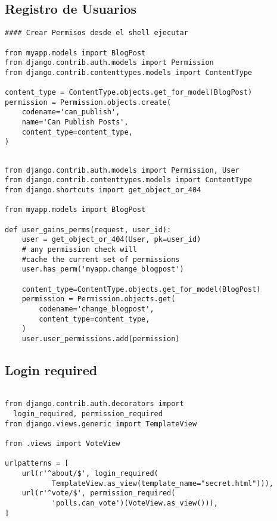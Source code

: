 \documentclass[xcolor=dvipsnames]{beamer}
\begin{document}
\subsection{Registro de Usuarios}
\begin{frame}[fragile]
\begin{verbatim}
#### Crear Permisos desde el shell ejecutar

from myapp.models import BlogPost
from django.contrib.auth.models import Permission
from django.contrib.contenttypes.models import ContentType

content_type = ContentType.objects.get_for_model(BlogPost)
permission = Permission.objects.create(
    codename='can_publish',
    name='Can Publish Posts',
    content_type=content_type,
)

\end{verbatim}
\end{frame}

\begin{frame}[fragile]
\begin{verbatim}

from django.contrib.auth.models import Permission, User
from django.contrib.contenttypes.models import ContentType
from django.shortcuts import get_object_or_404

from myapp.models import BlogPost

def user_gains_perms(request, user_id):
    user = get_object_or_404(User, pk=user_id)
    # any permission check will 
    #cache the current set of permissions
    user.has_perm('myapp.change_blogpost')

    content_type=ContentType.objects.get_for_model(BlogPost)
    permission = Permission.objects.get(
        codename='change_blogpost',
        content_type=content_type,
    )
    user.user_permissions.add(permission)

\end{verbatim}
\end{frame}

\subsection{Login required}
\begin{frame}[fragile]
\begin{verbatim}

from django.contrib.auth.decorators import 
  login_required, permission_required
from django.views.generic import TemplateView

from .views import VoteView

urlpatterns = [
    url(r'^about/$', login_required(
           TemplateView.as_view(template_name="secret.html"))),
    url(r'^vote/$', permission_required(
           'polls.can_vote')(VoteView.as_view())),
]

\end{verbatim}
\end{frame}
\end{document}
